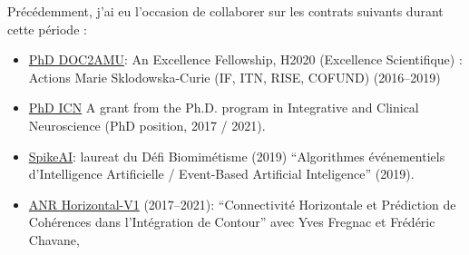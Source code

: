 \documentclass[10pt,french,a4paper,oneside]{article}%
\begin{document}
Précédemment, j'ai eu l'occasion de collaborer sur les contrats suivants durant cette période :
\begin{itemize}
	\item  \href{https://laurentperrinet.github.io/grant/doc-2-amu/}{PhD DOC2AMU}: An Excellence Fellowship, H2020 (Excellence Scientifique) : Actions Marie Sklodowska-Curie (IF, ITN, RISE, COFUND) (2016--2019)
	\item \href{https://laurentperrinet.github.io/grant/phd-icn/}{PhD ICN} A grant from the Ph.D. program in Integrative and Clinical Neuroscience (PhD position, 2017 / 2021).
	\item  \href{https://laurentperrinet.github.io/grant/spikeai/}{SpikeAI}: laureat du Défi Biomimétisme (2019) ``Algorithmes événementiels d’Intelligence Artificielle / Event-Based Artificial Inteligence'' (2019).
	 \item \href{https://laurentperrinet.github.io/grant/anr-horizontal-v1/}{ANR Horizontal-V1} (2017--2021): ``Connectivité Horizontale et Prédiction de Cohérences dans l’Intégration de Contour'' avec Yves Fregnac et Frédéric Chavane,

\end{itemize}
\end{document}
